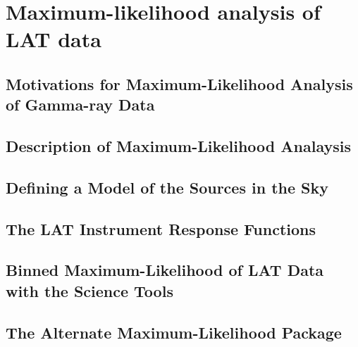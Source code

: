 \chapter{Maximum-likelihood analysis of LAT data}



\section{Motivations for Maximum-Likelihood Analysis of Gamma-ray Data}


\section{Description of Maximum-Likelihood Analaysis}


\section{Defining a Model of the Sources in the Sky}


\section{The LAT Instrument Response Functions}


\section{Binned Maximum-Likelihood of LAT Data with the Science Tools}



\section{The Alternate Maximum-Likelihood Package \pointlike}

